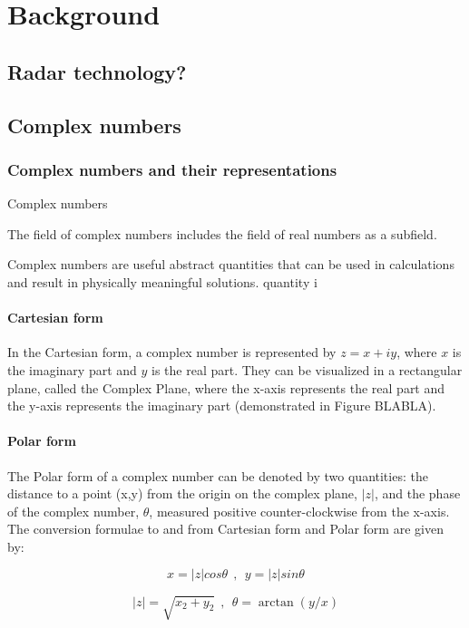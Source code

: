 \chapter{Background}\label{chap:comp}
\section{Radar technology?}


\section{Complex numbers}

\subsection{Complex numbers and their representations}
Complex numbers

The field of complex numbers includes the field of real numbers as a subfield.

Complex numbers are useful abstract quantities that can be used in calculations and result in physically meaningful solutions.
quantity i




\subsubsection{Cartesian form}
In the Cartesian form, a complex number is represented by $z=x+iy$, where $x$ is the imaginary part and $y$ is the real part. They can be visualized in a rectangular plane, called the Complex Plane, where the x-axis represents the real part and the y-axis represents the imaginary part (demonstrated in Figure BLABLA). 

\subsubsection{Polar form}
The Polar form of a complex number can be denoted by two quantities: 
the distance to a point (x,y) from the origin on the complex plane, $|z|$, and the phase of the complex number, $\theta$, measured positive counter-clockwise from the x-axis. The conversion formulae to and from Cartesian form and Polar form are given by:

\begin{equation}
x = |z|cos\theta  ~~,~~ y = |z|sin\theta 
\end{equation}

\begin{equation}
|z| = \sqrt{x_{2}+y_{2}}  ~~,~~ \theta = \arctan(y/x) 
\end{equation}


